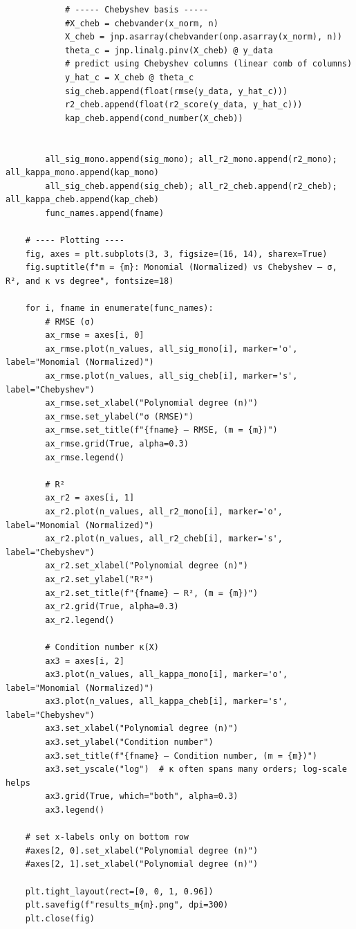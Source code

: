 \documentclass[a4paper,12pt]{article}
\begin{document}
\begin{lstlisting}
            # ----- Chebyshev basis -----
            #X_cheb = chebvander(x_norm, n)
            X_cheb = jnp.asarray(chebvander(onp.asarray(x_norm), n))
            theta_c = jnp.linalg.pinv(X_cheb) @ y_data
            # predict using Chebyshev columns (linear comb of columns)
            y_hat_c = X_cheb @ theta_c
            sig_cheb.append(float(rmse(y_data, y_hat_c)))
            r2_cheb.append(float(r2_score(y_data, y_hat_c)))
            kap_cheb.append(cond_number(X_cheb))


        all_sig_mono.append(sig_mono); all_r2_mono.append(r2_mono); all_kappa_mono.append(kap_mono)
        all_sig_cheb.append(sig_cheb); all_r2_cheb.append(r2_cheb); all_kappa_cheb.append(kap_cheb)
        func_names.append(fname)

    # ---- Plotting ----
    fig, axes = plt.subplots(3, 3, figsize=(16, 14), sharex=True)
    fig.suptitle(f"m = {m}: Monomial (Normalized) vs Chebyshev — σ, R², and κ vs degree", fontsize=18)

    for i, fname in enumerate(func_names):
        # RMSE (σ)
        ax_rmse = axes[i, 0]
        ax_rmse.plot(n_values, all_sig_mono[i], marker='o', label="Monomial (Normalized)")
        ax_rmse.plot(n_values, all_sig_cheb[i], marker='s', label="Chebyshev")
        ax_rmse.set_xlabel("Polynomial degree (n)")
        ax_rmse.set_ylabel("σ (RMSE)")
        ax_rmse.set_title(f"{fname} — RMSE, (m = {m})")
        ax_rmse.grid(True, alpha=0.3)
        ax_rmse.legend()

        # R²
        ax_r2 = axes[i, 1]
        ax_r2.plot(n_values, all_r2_mono[i], marker='o', label="Monomial (Normalized)")
        ax_r2.plot(n_values, all_r2_cheb[i], marker='s', label="Chebyshev")
        ax_r2.set_xlabel("Polynomial degree (n)")
        ax_r2.set_ylabel("R²")
        ax_r2.set_title(f"{fname} — R², (m = {m})")
        ax_r2.grid(True, alpha=0.3)
        ax_r2.legend()

        # Condition number κ(X)
        ax3 = axes[i, 2]
        ax3.plot(n_values, all_kappa_mono[i], marker='o', label="Monomial (Normalized)")
        ax3.plot(n_values, all_kappa_cheb[i], marker='s', label="Chebyshev")
        ax3.set_xlabel("Polynomial degree (n)")
        ax3.set_ylabel("Condition number")
        ax3.set_title(f"{fname} — Condition number, (m = {m})")
        ax3.set_yscale("log")  # κ often spans many orders; log-scale helps
        ax3.grid(True, which="both", alpha=0.3)
        ax3.legend()

    # set x-labels only on bottom row
    #axes[2, 0].set_xlabel("Polynomial degree (n)")
    #axes[2, 1].set_xlabel("Polynomial degree (n)")

    plt.tight_layout(rect=[0, 0, 1, 0.96])
    plt.savefig(f"results_m{m}.png", dpi=300)
    plt.close(fig)
\end{lstlisting}
\end{document}
